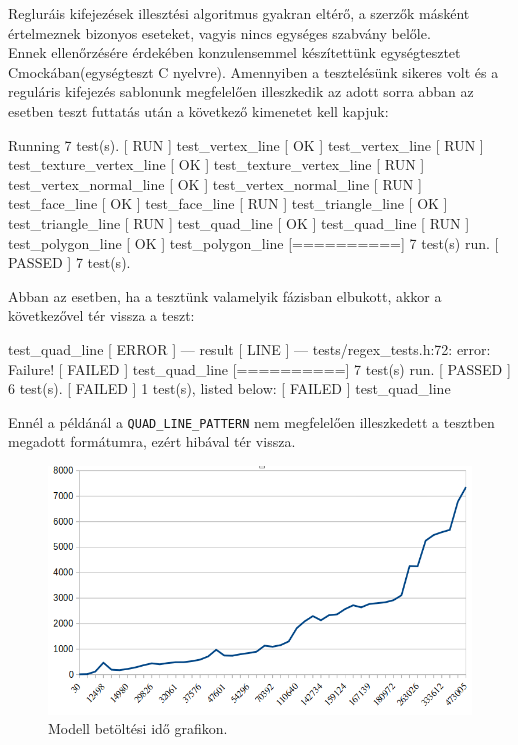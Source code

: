 

Regluráis kifejezések illesztési algoritmus gyakran eltérő, a szerzők másként értelmeznek bizonyos eseteket, vagyis nincs egységes szabvány belőle.\\

Ennek ellenőrzésére érdekében konzulensemmel készítettünk egységtesztet Cmockában(egységteszt C nyelvre). Amennyiben a tesztelésünk sikeres volt és a reguláris kifejezés sablonunk megfelelően illeszkedik az adott sorra abban az esetben teszt futtatás után a következő kimenetet kell kapjuk:
\bigskip
\begin{python}
[==========] Running 7 test(s).
[ RUN      ] test_vertex_line
[       OK ] test_vertex_line
[ RUN      ] test_texture_vertex_line
[       OK ] test_texture_vertex_line
[ RUN      ] test_vertex_normal_line
[       OK ] test_vertex_normal_line
[ RUN      ] test_face_line
[       OK ] test_face_line
[ RUN      ] test_triangle_line
[       OK ] test_triangle_line
[ RUN      ] test_quad_line
[       OK ] test_quad_line
[ RUN      ] test_polygon_line
[       OK ] test_polygon_line
[==========] 7 test(s) run.
[  PASSED  ] 7 test(s).
\end{python}
\newpage

\noindent Abban az esetben, ha a tesztünk valamelyik fázisban elbukott, akkor a következővel tér vissza a teszt:
\begin{python}
[ RUN      ] test_quad_line
[  ERROR   ] --- result
[   LINE   ] --- tests/regex_tests.h:72: error: Failure!
[  FAILED  ] test_quad_line
[==========] 7 test(s) run.
[  PASSED  ] 6 test(s).
[  FAILED  ] 1 test(s), listed below:
[  FAILED  ] test_quad_line
\end{python}
Ennél a példánál a \texttt{QUAD\_LINE\_PATTERN} nem megfelelően illeszkedett  a tesztben megadott formátumra, ezért hibával tér vissza.

\begin{figure}[h]
\centering
\includegraphics[width=\textwidth]{images/betoltesiido.png}
\caption{Modell betöltési idő grafikon.}
\label{fig:betolt}
\end{figure}

